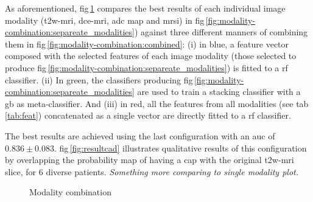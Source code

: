 \documentclass[num-refs]{wiley-article}
\begin{document}
As aforementioned, \ac{fig}\,\ref{fig:modality-combination} compares the best
results of each individual image modality (\ac{t2w}-\ac{mri}, \ac{dce}-\ac{mri},
\ac{adc} map and \ac{mrsi}) in 
\ac{fig}\,\ref{fig:modality-combination:separeate_modalities}) against three
different manners of combining them in \ac{fig}\,\ref{fig:modality-combination:combined}:
(i) in blue, a feature vector composed with the selected features of each image
modality (those selected to produce
\Ac{fig}\,\ref{fig:modality-combination:separeate_modalities}) is fitted to a
\ac{rf} classifier.
(ii) In green, the classifiers producing
\Ac{fig}\,\ref{fig:modality-combination:separeate_modalities} are used to train
a stacking classifier with a \ac{gb} as meta-classifier.
And (iii) in red, all the features from all modalities (see
\Ac{tab}\,\ref{tab:feat}) concatenated as a single vector are directly fitted to
a \ac{rf} classifier.

The best results are achieved using the last configuration with an \ac{auc} of
$0.836 \pm 0.083$.
\Acl{fig}\,\ref{fig:resultcad} illustrates qualitative results of this
configuration by overlapping the probability map of having a \ac{cap} with the
original \ac{t2w}-\ac{mri} slice, for 6 diverse patients.
\emph{Something more comparing to single modality plot.}

\begin{figure}
  \hspace*{\fill}
  \hfill
  \hspace*{\fill}
  \caption[modality combination] {Modality combination}
  \label{fig:modality-combination}
\end{figure}
\end{document}
